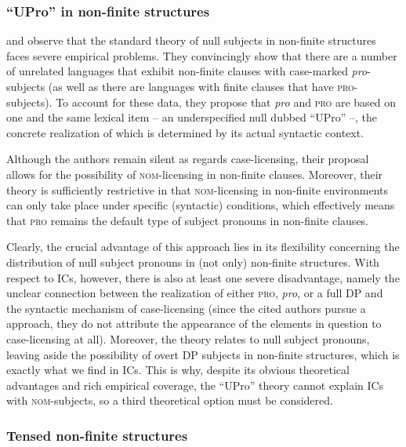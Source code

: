\documentclass[output=paper,colorlinks,citecolor=brown,newtxmath]{langsci/langscibook}
\begin{document}
\subsubsection{``UPro'' in non-finite structures}\label{sec:nom_possibilities_2}

\citet{Sundaresan2014} and \citet{McFaddenSundaresan2018} observe that the standard theory of  null subjects in non-finite structures faces severe empirical problems. They convincingly show that there are a number of unrelated languages that exhibit non-finite clauses with case-marked \textit{pro}-subjects (as well as there are languages with finite clauses that have \textsc{pro}-subjects). To account for these data, they propose that \textit{pro} and \textsc{pro} are based on one and the same lexical item -- an underspecified null  dubbed ``UPro'' --, the concrete realization of which is determined by its actual syntactic context.

Although the authors remain silent as regards case-licensing, their proposal allows for the possibility of \textsc{nom}-licensing in non-finite clauses. Moreover, their theory is sufficiently restrictive in that \textsc{nom}-licensing in non-finite environments can only take place under specific (syntactic) conditions, which effectively means that \textsc{pro} remains the default type of subject pronouns in non-finite clauses.

Clearly, the crucial advantage of this approach lies in its flexibility concerning the distribution of null subject pronouns in (not only) non-finite structures. With respect to ICs, however, there is also at least one severe disadvantage, namely the unclear connection between the realization of either \textsc{pro}, \textit{pro}, or a full DP and the syntactic mechanism of case-licensing (since the cited authors pursue a  approach, they do not attribute the appearance of the elements in question to case-licensing at all). Moreover, the theory relates to null subject pronouns, leaving aside the possibility of overt DP subjects in non-finite structures, which is exactly what we find in  ICs. This is why, despite its obvious theoretical advantages and rich empirical coverage, the ``UPro'' theory cannot explain ICs with \textsc{nom}-subjects, so a third theoretical option must be considered.

\subsubsection{Tensed non-finite structures}\label{sec:nom_possibilities_3}
\end{document}
